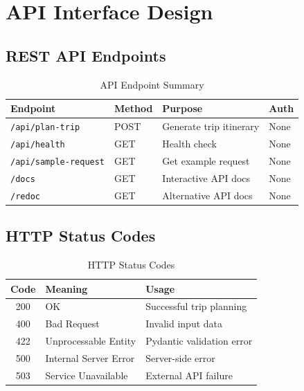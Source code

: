 \documentclass[12pt,a4paper]{report}
\begin{document}
\section{API Interface Design}

\subsection{REST API Endpoints}

\begin{table}[H]
\centering
\begin{tabular}{|l|l|p{5cm}|l|}
\hline
\textbf{Endpoint} & \textbf{Method} & \textbf{Purpose} & \textbf{Auth} \\
\hline
\texttt{/api/plan-trip} & POST & Generate trip itinerary & None \\
\hline
\texttt{/api/health} & GET & Health check & None \\
\hline
\texttt{/api/sample-request} & GET & Get example request & None \\
\hline
\texttt{/docs} & GET & Interactive API docs & None \\
\hline
\texttt{/redoc} & GET & Alternative API docs & None \\
\hline
\end{tabular}
\caption{API Endpoint Summary}
\label{tab:api-endpoints}
\end{table}

\subsection{HTTP Status Codes}

\begin{table}[H]
\centering
\begin{tabular}{|c|l|p{8cm}|}
\hline
\textbf{Code} & \textbf{Meaning} & \textbf{Usage} \\
\hline
200 & OK & Successful trip planning \\
\hline
400 & Bad Request & Invalid input data \\
\hline
422 & Unprocessable Entity & Pydantic validation error \\
\hline
500 & Internal Server Error & Server-side error \\
\hline
503 & Service Unavailable & External API failure \\
\hline
\end{tabular}
\caption{HTTP Status Codes}
\label{tab:http-codes}
\end{table}
\end{document}
